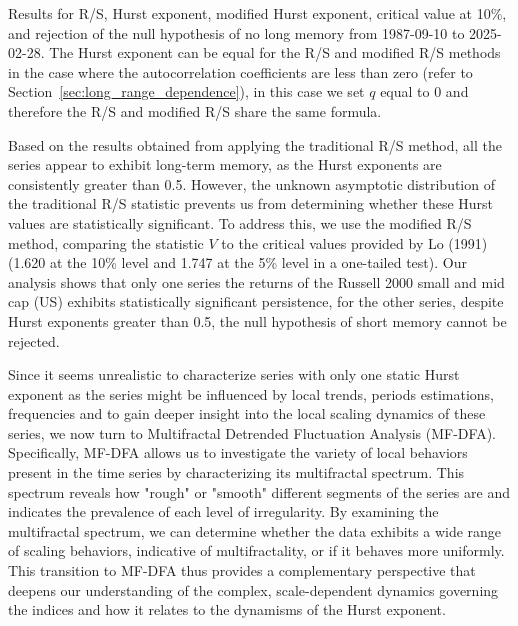 \documentclass[11pt]{extarticle}
\begin{document}
\begin{table}[h!]
    \centering
    \caption{Results for R/S, Hurst exponent, modified Hurst exponent, critical value at 10\%, and rejection of the null
    hypothesis of no long memory from 1987-09-10 to 2025-02-28. The Hurst exponent can be equal for the R/S and modified R/S methods in the case where
    the autocorrelation coefficients are less than zero (refer to Section~\ref{sec:long_range_dependence}), in this case we set $q$ equal to 0 and therefore the R/S and modified R/S share the same formula.}
    \label{tab:Hurst_results}
\end{table}

\FloatBarrier


Based on the results obtained from applying the traditional R/S method, all the series appear to exhibit long-term memory,
as the Hurst exponents are consistently greater than 0.5. However, the unknown asymptotic distribution of the traditional R/S
statistic prevents us from determining whether these Hurst values are statistically significant. To address this, we use the modified
R/S method, comparing the statistic \( V \) to the critical values provided by Lo (1991) (1.620 at the 10\% level and 1.747 at the 5\%
level in a one-tailed test). Our analysis shows that only one series the returns of the Russell 2000 small and mid cap (US) exhibits
statistically significant persistence, for the other series, despite Hurst exponents greater than 0.5, the null hypothesis of short memory cannot be rejected.

Since it seems unrealistic to characterize series with only one static Hurst exponent as the series might be influenced by local trends,
periods estimations, frequencies and to gain deeper insight into
the local scaling dynamics of these series, we now turn to Multifractal Detrended Fluctuation Analysis (MF-DFA).
Specifically, MF-DFA allows us to investigate the variety of local behaviors present in the time series by characterizing its multifractal
spectrum. This spectrum reveals how "rough" or "smooth" different segments of the series are and indicates the prevalence of each level of
irregularity. By examining the multifractal spectrum, we can determine whether the data exhibits a wide range of scaling behaviors, indicative
of multifractality, or if it behaves more uniformly. This transition to MF-DFA thus provides a complementary perspective that deepens our understanding
of the complex, scale-dependent dynamics governing the indices and how it relates to the dynamisms of the Hurst exponent.
\end{document}
